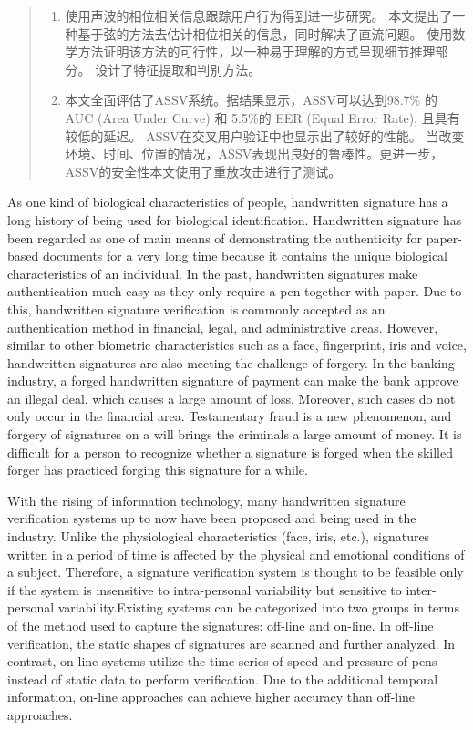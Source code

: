 \begin{abstract}
\begin{enumerate}[label=(\arabic*)]
    \item 使用声波的相位相关信息跟踪用户行为得到进一步研究。 本文提出了一种基于弦的方法去估计相位相关的信息，同时解决了直流问题。 使用数学方法证明该方法的可行性，以一种易于理解的方式呈现细节推理部分。 设计了特征提取和判别方法。
    
    \item 本文全面评估了ASSV系统。据结果显示，ASSV可以达到98.7\% 的 AUC (Area Under Curve) 和 5.5\%的 EER (Equal Error Rate), 且具有较低的延迟。 ASSV在交叉用户验证中也显示出了较好的性能。 当改变环境、时间、位置的情况，ASSV表现出良好的鲁棒性。更进一步，ASSV的安全性本文使用了重放攻击进行了测试。
\end{enumerate}


\end{abstract}
\begin{englishabstract}

As one kind of biological characteristics of people, handwritten signature has a long history of being used for biological identification. Handwritten signature has been regarded as one of main means of demonstrating the authenticity for paper-based
documents for a very long time because it contains the unique biological characteristics of an individual. In the past, handwritten signatures make authentication much easy as they only require a pen together with paper. Due to this, handwritten signature verification is commonly accepted as an authentication method in financial, legal, and administrative areas. However, similar to other biometric characteristics such as a face, fingerprint, iris and voice, handwritten signatures are also meeting the challenge of forgery. In the banking industry, a forged handwritten signature of payment can make the bank approve an illegal deal, which causes a large amount of loss. Moreover, such cases do not only occur in the financial area. Testamentary fraud is a new phenomenon, and forgery of signatures on a will brings the criminals a large amount of money. It is difficult for a person to recognize whether a signature is forged when the skilled forger has practiced forging this signature for a while.

With the rising of information technology, many handwritten signature verification systems up to now have been proposed and being used in the industry. Unlike the physiological characteristics (face, iris, etc.), signatures written in a period of time is affected by
the physical and emotional conditions of a subject. Therefore, a signature verification system is thought to be feasible only if the system is insensitive to intra-personal variability but sensitive to inter-personal variability.Existing systems can be categorized into two groups in terms of the method used to capture the signatures: off-line and on-line. In off-line verification, the static shapes of signatures are scanned and further analyzed. In contrast, on-line systems utilize the time series of speed and pressure of pens instead of static data to perform verification. Due to the additional temporal information, on-line approaches can achieve higher accuracy than off-line approaches.


\end{englishabstract}
